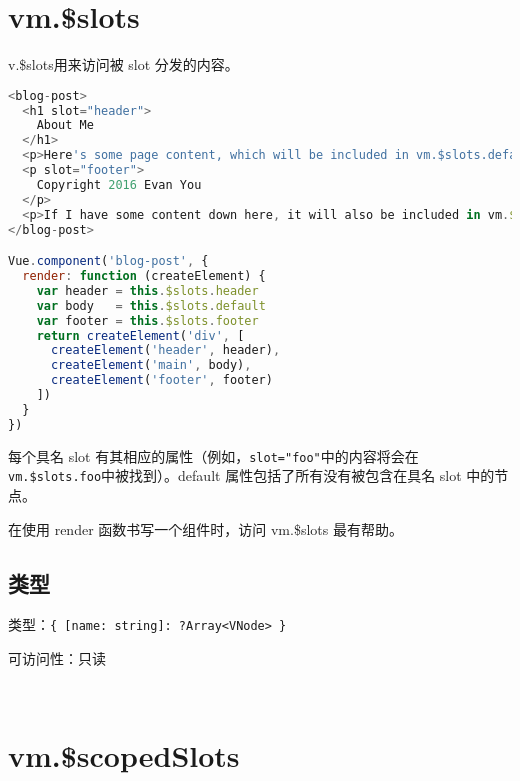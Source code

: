 \section{vm.\$slots}


v.\$slots用来访问被 slot 分发的内容。


\begin{lstlisting}[language=JavaScript]
<blog-post>
  <h1 slot="header">
    About Me
  </h1>
  <p>Here's some page content, which will be included in vm.$slots.default, because it's not inside a named slot.</p>
  <p slot="footer">
    Copyright 2016 Evan You
  </p>
  <p>If I have some content down here, it will also be included in vm.$slots.default.</p>.
</blog-post>

Vue.component('blog-post', {
  render: function (createElement) {
    var header = this.$slots.header
    var body   = this.$slots.default
    var footer = this.$slots.footer
    return createElement('div', [
      createElement('header', header),
      createElement('main', body),
      createElement('footer', footer)
    ])
  }
})
\end{lstlisting}


每个具名 slot 有其相应的属性（例如，\texttt{slot="foo"}中的内容将会在 \texttt{vm.\$slots.foo}中被找到）。default 属性包括了所有没有被包含在具名 slot 中的节点。

在使用 render 函数书写一个组件时，访问 vm.\$slots 最有帮助。

\subsection{类型}


\begin{compactitem}
\item 类型：\texttt{\{ [name: string]: ?Array<VNode> \}}
\item 可访问性：只读
\end{compactitem}






\begin{lstlisting}[language=JavaScript]

\end{lstlisting}




\begin{lstlisting}[language=JavaScript]

\end{lstlisting}


\section{vm.\$scopedSlots}

